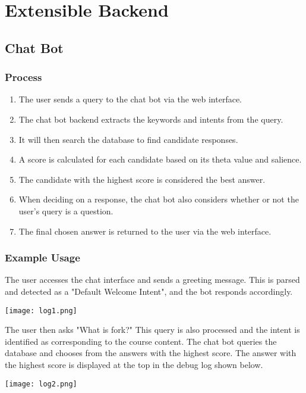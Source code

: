 \section{Extensible Backend}
\subsection{Chat Bot}
\subsubsection{Process}
\begin{enumerate}
    \item{The user sends a query to the chat bot via the web interface.}
    \item{The chat bot backend extracts the keywords and intents from the query.}
    \item{It will then search the database to find candidate responses.}
    \item{A score is calculated for each candidate based on its theta value and salience.}
    \item{The candidate with the highest score is considered the best answer.}
    \item{When deciding on a response, the chat bot also considers whether or not the user's query is a question.}
    \item{The final chosen answer is returned to the user via the web interface.}
\end{enumerate}

\subsubsection{Example Usage}
The user accesses the chat interface and sends a greeting message. This is parsed and detected as a "Default Welcome Intent", and the bot responds accordingly.

\begin{center}
    \texttt{[image: log1.png]}
\end{center}

The user then asks "What is fork?" This query is also processed and the intent is identified as corresponding to the course content. The chat bot queries the database and chooses from the answers with the highest score. The answer with the highest score is displayed at the top in the debug log shown below.

\begin{center}
    \texttt{[image: log2.png]}
\end{center}

